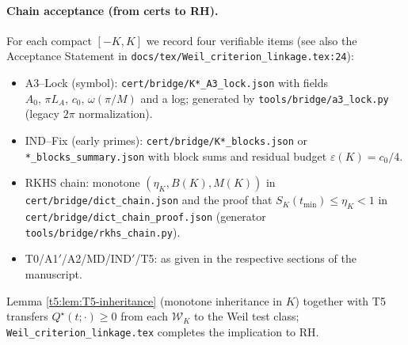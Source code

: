 \paragraph{Chain acceptance (from certs to RH).}
For each compact $[-K,K]$ we record four verifiable items (see also the Acceptance Statement in \texttt{docs/tex/Weil\_criterion\_linkage.tex:24}):
\begin{itemize}
  \item A3--Lock (symbol): \verb|cert/bridge/K*_A3_lock.json| with fields $A_0,\,\pi L_A,\,c_0,\,\omega(\pi/M)$ and a log; generated by \verb|tools/bridge/a3_lock.py| (legacy $2\pi$ normalization).
  \item IND--Fix (early primes): \verb|cert/bridge/K*_blocks.json| or \verb|*_blocks_summary.json| with block sums and residual budget $\varepsilon(K)=c_0/4$.
  \item RKHS chain: monotone $(\eta_K,B(K),M(K))$ in \verb|cert/bridge/dict_chain.json| and the proof that $S_K(t_{\min})\le\eta_K<1$ in \verb|cert/bridge/dict_chain_proof.json| (generator \verb|tools/bridge/rkhs_chain.py|).
  \item T0/A1$'$/A2/MD/IND$'$/T5: as given in the respective sections of the manuscript.
\end{itemize}
Lemma \ref{t5:lem:T5-inheritance} (monotone inheritance in $K$) together with T5 transfers $Q^\star(t;\cdot)\ge0$ from each $\mathcal W_K$ to the Weil test class; \texttt{Weil\_criterion\_linkage.tex} completes the implication to RH.

